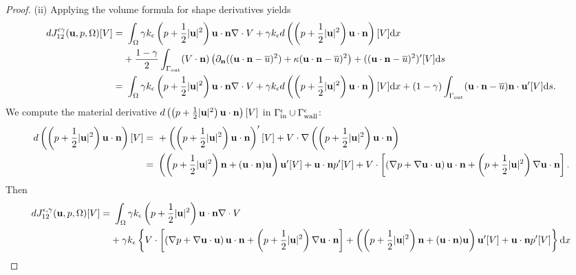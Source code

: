 \documentclass[oneside,11pt]{book}
\numberwithin{equation}{section}
\begin{document}
\begin{proof}
    (ii) Applying the volume formula for shape derivatives yields
    \begin{align}
        dJ_{12}^{\epsilon\gamma}({\bf u},p,\Omega)[V] =&\ \int_\Omega \gamma k_\epsilon\left(p + \frac{1}{2}|{\bf u}|^2\right){\bf u}\cdot{\bf n}\nabla\cdot V + \gamma k_\epsilon d\left(\left(p + \frac{1}{2}|{\bf u}|^2\right){\bf u}\cdot{\bf n}\right)[V]{\rm d}x\\
        &+ \frac{1 - \gamma}{2}\int_{\Gamma_{\rm out}} (V\cdot{\bf n})\left(\partial_{\bf n}(({\bf u}\cdot{\bf n} - \overline{u})^2) + \kappa({\bf u}\cdot{\bf n} - \overline{u})^2\right) + (({\bf u}\cdot{\bf n} - \overline{u})^2)'[V]{\rm d}s\\
        =&\ \int_\Omega \gamma k_\epsilon\left(p + \frac{1}{2}|{\bf u}|^2\right){\bf u}\cdot{\bf n}\nabla\cdot V + \gamma k_\epsilon d\left(\left(p + \frac{1}{2}|{\bf u}|^2\right){\bf u}\cdot{\bf n}\right)[V]{\rm d}x + (1 - \gamma)\int_{\Gamma_{\rm out}} ({\bf u}\cdot{\bf n} - \overline{u}){\bf n}\cdot{\bf u}'[V]{\rm d}s.
    \end{align}
    We compute the material derivative $d\left(\left(p + \frac{1}{2}|{\bf u}|^2\right){\bf u}\cdot{\bf n}\right)[V]$ in $\Gamma_{\rm in}^\epsilon\cup\Gamma_{\rm wall}^\epsilon$:
    \begin{align}
        d\left(\left(p + \frac{1}{2}|{\bf u}|^2\right){\bf u}\cdot{\bf n}\right)[V] =&\ + \left(\left(p + \frac{1}{2}|{\bf u}|^2\right){\bf u}\cdot{\bf n}\right)'[V] + V\cdot\nabla\left(\left(p + \frac{1}{2}|{\bf u}|^2\right){\bf u}\cdot{\bf n}\right)\\
        =&\ \left(\left(p + \frac{1}{2}|{\bf u}|^2\right){\bf n} + ({\bf u}\cdot{\bf n}){\bf u}\right){\bf u}'[V] + {\bf u}\cdot{\bf n}p'[V] + V\cdot\left[\left(\nabla p + \nabla{\bf u}\cdot{\bf u}\right){\bf u}\cdot{\bf n} + \left(p + \frac{1}{2}|{\bf u}|^2\right)\nabla{\bf u}\cdot{\bf n}\right].
    \end{align}
    Then
    \begin{align}
        dJ_{12}^{\epsilon,\gamma}({\bf u},p,\Omega)[V] =&\ \int_\Omega \gamma k_\epsilon\left(p + \frac{1}{2}|{\bf u}|^2\right){\bf u}\cdot{\bf n}\nabla\cdot V\\
        &+ \gamma k_\epsilon \left\{V\cdot\left[\left(\nabla p + \nabla{\bf u}\cdot{\bf u}\right){\bf u}\cdot{\bf n} + \left(p + \frac{1}{2}|{\bf u}|^2\right)\nabla{\bf u}\cdot{\bf n}\right] + \left(\left(p + \frac{1}{2}|{\bf u}|^2\right){\bf n} + ({\bf u}\cdot{\bf n}){\bf u}\right){\bf u}'[V] + {\bf u}\cdot{\bf n}p'[V]\right\}{\rm d}x\\

\end{align}
\end{proof}
\end{document}
